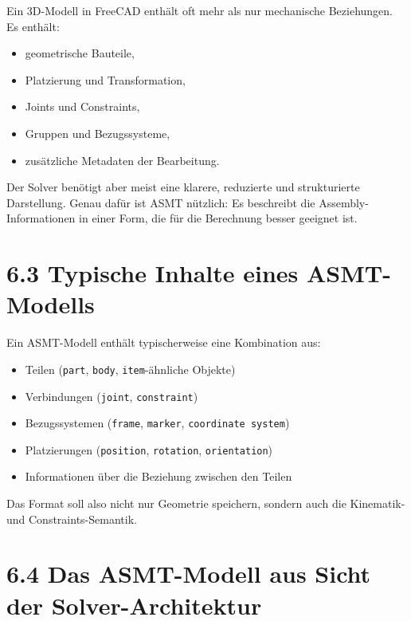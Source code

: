 \documentclass[
  12pt
]{book}
\providecommand{\tightlist}{%
  \setlength{\itemsep}{0pt}\setlength{\parskip}{0pt}}
\begin{document}
Ein 3D-Modell in FreeCAD enthält oft mehr als nur mechanische
Beziehungen. Es enthält:

\begin{itemize}
\tightlist
\item
  geometrische Bauteile,
\item
  Platzierung und Transformation,
\item
  Joints und Constraints,
\item
  Gruppen und Bezugssysteme,
\item
  zusätzliche Metadaten der Bearbeitung.
\end{itemize}

Der Solver benötigt aber meist eine klarere, reduzierte und
strukturierte Darstellung. Genau dafür ist ASMT nützlich: Es beschreibt
die Assembly-Informationen in einer Form, die für die Berechnung besser
geeignet ist.

\hypertarget{typische-inhalte-eines-asmt-modells}{%
\section{\texorpdfstring{{6.3} Typische Inhalte eines
ASMT-Modells}{6.3 Typische Inhalte eines ASMT-Modells}}\label{typische-inhalte-eines-asmt-modells}}

Ein ASMT-Modell enthält typischerweise eine Kombination aus:

\begin{itemize}
\tightlist
\item
  Teilen (\texttt{part}, \texttt{body}, \texttt{item}-ähnliche Objekte)
\item
  Verbindungen (\texttt{joint}, \texttt{constraint})
\item
  Bezugssystemen (\texttt{frame}, \texttt{marker},
  \texttt{coordinate\ system})
\item
  Platzierungen (\texttt{position}, \texttt{rotation},
  \texttt{orientation})
\item
  Informationen über die Beziehung zwischen den Teilen
\end{itemize}

Das Format soll also nicht nur Geometrie speichern, sondern auch die
Kinematik- und Constraints-Semantik.

\hypertarget{das-asmt-modell-aus-sicht-der-solver-architektur}{%
\section{\texorpdfstring{{6.4} Das ASMT-Modell aus Sicht der
Solver-Architektur}{6.4 Das ASMT-Modell aus Sicht der Solver-Architektur}}\label{das-asmt-modell-aus-sicht-der-solver-architektur}}
\end{document}
